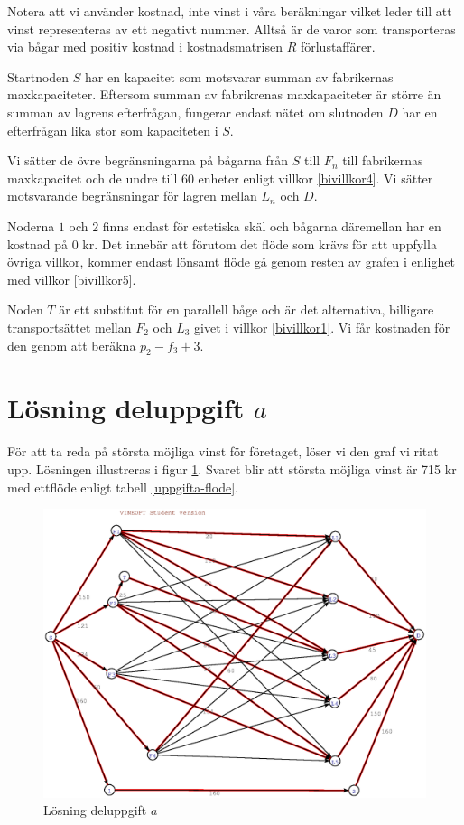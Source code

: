\documentclass[titlepage, a4paper]{article}
\begin{document}
Notera att vi använder kostnad, inte vinst i våra beräkningar vilket leder till att vinst representeras av ett negativt nummer. Alltså är de varor som transporteras via bågar med positiv kostnad i kostnadsmatrisen $R$ förlustaffärer.

Startnoden $S$ har en kapacitet som motsvarar summan av fabrikernas maxkapaciteter. Eftersom summan av fabrikrenas maxkapaciteter är större än summan av lagrens efterfrågan, fungerar endast nätet om slutnoden $D$ har en efterfrågan lika stor som kapaciteten i $S$.

Vi sätter de övre begränsningarna på bågarna från $S$ till $F_{n}$ till fabrikernas maxkapacitet och de undre till 60 enheter enligt villkor \ref{bivillkor4}. Vi sätter motsvarande begränsningar för lagren mellan $L_{n}$ och $D$.

Noderna $1$ och $2$ finns endast för estetiska skäl och bågarna däremellan har en kostnad på 0 kr. Det innebär att förutom det flöde som krävs för att uppfylla övriga villkor, kommer endast lönsamt flöde gå genom resten av grafen i enlighet med villkor \ref{bivillkor5}.

Noden $T$ är ett substitut för en parallell båge och är det alternativa, billigare transportsättet mellan $F_{2}$ och $L_{3}$ givet i villkor \ref{bivillkor1}. Vi får kostnaden för den genom att beräkna $p_{2}-f_{3}+3$.

\section{Lösning deluppgift $a$}

För att ta reda på största möjliga vinst för företaget, löser vi den graf vi ritat upp. Lösningen illustreras i figur \ref{uppgifta-losning}. Svaret blir att största möjliga vinst är 715 kr med ettflöde enligt tabell \ref{uppgifta-flode}.

\begin{figure}[h!]
\centerline{\includegraphics[scale=0.65]{laborationsuppgift_13a_solved.ps}}
\caption{Lösning deluppgift $a$} \label{uppgifta-losning}
\end{figure}
\end{document}
